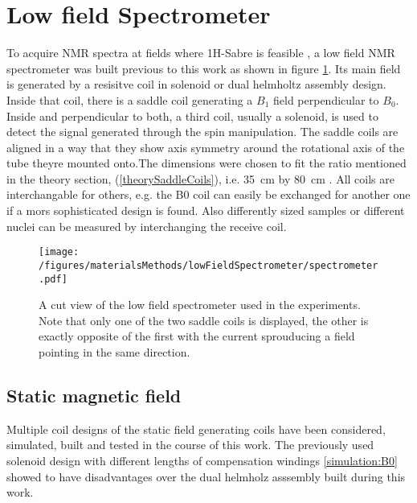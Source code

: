         \section{Low field Spectrometer}
        To acquire NMR spectra at fields where 1H-Sabre is feasible , a low field NMR spectrometer was built  previous to this work as shown in figure \ref{figure:materialsMethods:lowFieldSpec}. Its main field is generated by a resisitve coil in solenoid or dual helmholtz assembly design. Inside that coil, there is a saddle coil generating a $B_1$ field perpendicular to $B_0$. Inside and perpendicular to both, a third coil, usually a solenoid, is used to detect the signal generated through the spin manipulation. The saddle coils are aligned in a way that they show axis symmetry around the rotational axis of the tube theyre mounted onto.The dimensions were chosen to fit the ratio mentioned in the theory section, (\ref{theorySaddleCoils}), i.e. \SI{35}{\cm} by \SI{80}{\cm} . All coils are interchangable for others, e.g. the B0 coil can easily be exchanged for another one if a mors sophisticated design is found. Also differently sized samples or different nuclei can be measured by interchanging the receive coil.
        \begin{figure}
            \texttt{[image: /figures/materialsMethods/lowFieldSpectrometer/spectrometer.pdf]}
            \caption[Schematic view low field spectrometer]{A cut view of the low field spectrometer used in the experiments. Note that only one of the two saddle coils is displayed, the other is exactly opposite of the first with the current sprouducing a field pointing in the same direction.}
            \label{figure:materialsMethods:lowFieldSpec}
        \end{figure}
        \subsection{Static magnetic field}
            Multiple coil designs of the static field generating coils have been  considered, simulated, built and tested in the course of this work. The previously used solenoid design with different lengths of compensation windings \ref{simulation:B0} showed to have disadvantages over the dual helmholz asssembly built during this work.
